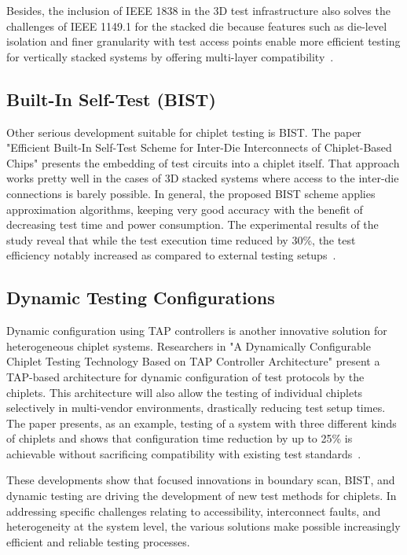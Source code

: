 \documentclass[acmtog, 12pt]{acmart}
\begin{document}
Besides, the inclusion of IEEE 1838 in the 3D test infrastructure also solves the challenges of IEEE 1149.1 for the stacked die because features such as die-level isolation and finer granularity with test access points enable more efficient testing for vertically stacked systems by offering multi-layer compatibility~\cite{6515989}.


\subsection*{Built-In Self-Test (BIST)}

Other serious development suitable for chiplet testing is BIST. The paper "Efficient Built-In Self-Test Scheme for Inter-Die Interconnects of Chiplet-Based Chips" presents the embedding of test circuits into a chiplet itself. That approach works pretty well in the cases of 3D stacked systems where access to the inter-die connections is barely possible. In general, the proposed BIST scheme applies approximation algorithms, keeping very good accuracy with the benefit of decreasing test time and power consumption. The experimental results of the study reveal that while the test execution time reduced by 30\%, the test efficiency notably increased as compared to external testing setups~\cite{10766679}.


\subsection*{Dynamic Testing Configurations}

Dynamic configuration using TAP controllers is another innovative solution for heterogeneous chiplet systems. Researchers in "A Dynamically Configurable Chiplet Testing Technology Based on TAP Controller Architecture" present a TAP-based architecture for dynamic configuration of test protocols by the chiplets. This architecture will also allow the testing of individual chiplets selectively in multi-vendor environments, drastically reducing test setup times. The paper presents, as an example, testing of a system with three different kinds of chiplets and shows that configuration time reduction by up to 25\% is achievable without sacrificing compatibility with existing test standards~\cite{9824550}.

These developments show that focused innovations in boundary scan, BIST, and dynamic testing are driving the development of new test methods for chiplets. In addressing specific challenges relating to accessibility, interconnect faults, and heterogeneity at the system level, the various solutions make possible increasingly efficient and reliable testing processes.
\end{document}
